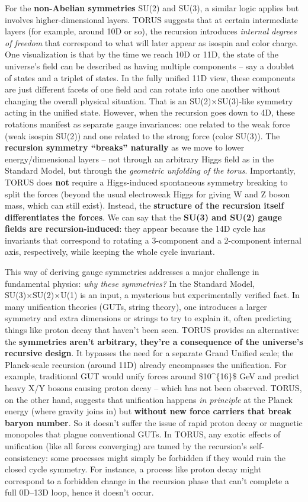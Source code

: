 \documentclass[]{article}
\begin{document}
For the \textbf{non-Abelian symmetries} SU(2) and SU(3), a similar logic
applies but involves higher-dimensional layers. TORUS suggests that at
certain intermediate layers (for example, around 10D or so), the
recursion introduces \emph{internal degrees of freedom} that correspond
to what will later appear as isospin and color charge​. One
visualization is that by the time we reach 10D or 11D, the state of the
universe's field can be described as having multiple components -- say a
doublet of states and a triplet of states. In the fully unified 11D
view, these components are just different facets of one field and can
rotate into one another without changing the overall physical situation.
That is an SU(2)×SU(3)-like symmetry acting in the unified state.
However, when the recursion goes down to 4D, these rotations manifest as
separate gauge invariances: one related to the weak force (weak isospin
SU(2)) and one related to the strong force (color SU(3)). The
\textbf{recursion symmetry ``breaks'' naturally} as we move to lower
energy/dimensional layers -- not through an arbitrary Higgs field as in
the Standard Model, but through the \emph{geometric unfolding of the
torus}. Importantly, TORUS does \textbf{not} require a Higgs-induced
spontaneous symmetry breaking to split the forces (beyond the usual
electroweak Higgs for giving W and Z boson mass, which can still exist).
Instead, the \textbf{structure of the recursion itself differentiates
the forces}​. We can say that the \textbf{SU(3) and SU(2) gauge fields
are recursion-induced}: they appear because the 14D cycle has invariants
that correspond to rotating a 3-component and a 2-component internal
axis, respectively, while keeping the whole cycle invariant.

This way of deriving gauge symmetries addresses a major challenge in
fundamental physics: \emph{why these symmetries?} In the Standard Model,
SU(3)×SU(2)×U(1) is an input, a mysterious but experimentally verified
fact. In many unification theories (GUTs, string theory), one introduces
a larger symmetry and extra dimensions or strings to try to explain it,
often predicting things like proton decay that haven't been seen. TORUS
provides an alternative: the \textbf{symmetries aren't arbitrary,
they're a consequence of the universe's recursive design}. It bypasses
the need for a separate Grand Unified scale; the Planck-scale recursion
(around 11D) already encompasses the unification​. For example,
traditional GUT would unify forces around \$10\^{}\{16\}\$ GeV and
predict heavy X/Y bosons causing proton decay -- which has not been
observed. TORUS, on the other hand, suggests that unification happens
\emph{in principle} at the Planck energy (where gravity joins in) but
\textbf{without new force carriers that break baryon number}. So it
doesn't suffer the issue of rapid proton decay or magnetic monopoles
that plague conventional GUTs​. In TORUS, any exotic effects of
unification (like all forces converging) are tamed by the recursion's
self-consistency: some processes might simply be forbidden if they would
ruin the closed cycle symmetry. For instance, a process like proton
decay might correspond to a forbidden change in the recursion phase that
can't complete a full 0D--13D loop, hence it doesn't occur.
\end{document}
